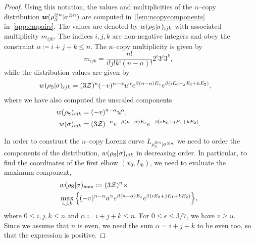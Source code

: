 \documentclass[pra,
aps,
twocolumn,
superscriptaddress,
groupedaddress,
nofootinbib,
reprint
]{revtex4-1}
\begin{document}
\begin{proof}
Using this notation, the values and multiplicities of the $n$--copy distribution $\bm{w}(\rho^{\otimes n}_S |\sigma^{\otimes n})$ are computed in~\cref{lem:ncopycomponents} in~\cref{app:cmpairs}. The values are denoted by $w(\rho_{\rm{S}} | \sigma)_{ijk}$ with associated multiplicity $m_{ijk}$. The indices $i,j,k$ are non-negative integers and obey the constraint $\alpha \coloneqq i+j+k \leq n$.
The $n$--copy multiplicity is given by
\begin{equation}
	m_{ijk} = \frac{n!}{i!j!k!(n-\alpha)!} 2^i 3^j 3^k,
\end{equation}
while the distribution values are given by
\begin{align}\label{eq:ncopy_w_rescaled}
	w(\rho_{\rm{S}} | \sigma)_{ijk} &= (3\mathcal{Z})^{n} (-v)^{n-\alpha} u^{\alpha} e^{\beta (n-\alpha)E_s} e^{\beta ( i E_0 + j E_1 + k E_2 )},
\end{align}
where we have also computed the unscaled components
\begin{align}
	w(\rho_{\rm{S}})_{ijk} &= (-v)^{n-\alpha} u^{\alpha}, \label{eq:ncopy_wrho}\\
	w(\sigma)_{ijk} &= (3\mathcal{Z})^{-n} e^{-\beta (n-\alpha)E_s} e^{-\beta ( i E_0 + j E_1 + k E_2 )}. \label{eq:ncopy_wsigma}
\end{align}

In order to construct the $n$--copy Lorenz curve ${L_{\rho_{\rm{S}}^{\otimes n}|\sigma^{\otimes n}}}$ we need to order the components of the distribution, $w(\rho_{\rm{S}} | \sigma)_{ijk}$ in decreasing order.
In particular, to find the coordinates of the first elbow $(x_0, L_0)$, we need to evaluate the maximum component,
\begin{align}
	&w(\rho_{\rm{S}} | \sigma)_{\rm{max}} \coloneqq (3\mathcal{Z})^{n}\times \nonumber\\
	&\max\limits_{i,j,k}\Big\{ (-v)^{n-\alpha} u^{\alpha} e^{\beta (n-\alpha)E_s} e^{\beta ( i E_0 + j E_1 + k E_2 )} \Big\}, \label{eq:max_slope}
\end{align}
where $0 \leq i,j,k \leq n$ and $\alpha \coloneqq i+j+k \leq n$.
For $0 \leq \epsilon \leq 3/7$, we have $v \geq u$. Since we assume that $n$ is even, we need the sum $\alpha = i+j+k$ to be even too, so that the expression is positive. 


\end{proof}
\end{document}
